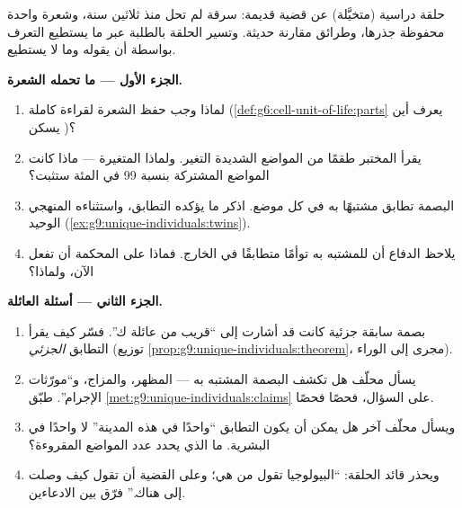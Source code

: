 \begin{problem}\label{pb:g9:unique-individuals:1}
حلقة دراسية (متخيَّلة) عن قضية قديمة: سرقة لم تحل منذ
ثلاثين سنة، وشعرة واحدة محفوظة  جذرها، وطرائق
مقارنة حديثة. وتسير الحلقة بالطلبة عبر ما يستطيع التعرف
بواسطة  أن يقوله وما لا يستطيع.

\medskip\noindent\textbf{الجزء الأول --- ما تحمله
الشعرة.}
\begin{enumerate}
  \item لماذا وجب حفظ \emph{} الشعرة لقراءة كاملة
        (\cref{def:g6:cell-unit-of-life:parts} يعرف أين
        يسكن )؟
  \item يقرأ المختبر طقمًا من المواضع الشديدة التغير.
        ولماذا المتغيرة --- ماذا كانت المواضع المشتركة
        بنسبة 99 في المئة ستثبت؟
  \item البصمة تطابق مشتبهًا به في كل موضع. اذكر ما
        يؤكده التطابق، واستثناءه المنهجي الوحيد
        (\cref{ex:g9:unique-individuals:twins}).
  \item يلاحظ الدفاع أن للمشتبه به توأمًا متطابقًا في
        الخارج. فماذا على المحكمة أن تفعل الآن، ولماذا؟
\end{enumerate}

\medskip\noindent\textbf{الجزء الثاني --- أسئلة
العائلة.}
\begin{enumerate}[resume]
  \item بصمة سابقة جزئية كانت قد أشارت إلى ``قريب من
        عائلة ك''. فسّر كيف يقرأ التطابق \emph{الجزئي}
         (توزيع
        \cref{prop:g9:unique-individuals:theorem}، مجرى
        إلى الوراء).
  \item يسأل محلّف هل تكشف البصمة  المشتبه به ---
        المظهر، والمزاج، و``مورّثات الإجرام''. طبّق
        \cref{met:g9:unique-individuals:claims} على
        السؤال، فحصًا فحصًا.
  \item ويسأل محلّف آخر هل يمكن أن يكون التطابق
        ``واحدًا في هذه المدينة'' لا واحدًا في البشرية.
        ما الذي يحدد عدد المواضع المقروءة؟
  \item ويحذر قائد الحلقة: ``البيولوجيا تقول  من
        هي؛ وعلى القضية أن تقول كيف وصلت إلى هناك.''
        فرّق بين الادعاءين.
\end{enumerate}


\end{problem}
